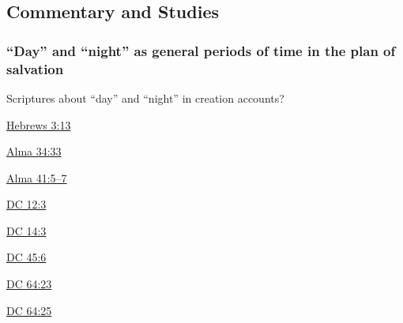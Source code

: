 	
\subsection{Commentary and Studies} %
	\label{DAY-COMMENTARY}

	
		
	\subsubsection{``Day'' and ``night'' as general periods of time in the plan of salvation}
		\label{DAY-night}
		
		\begin{compactitem}
			\item Scriptures about ``day'' and ``night'' in creation accounts? 
			\item \hyperref[HEBREWS-3-13]{Hebrews 3:13}
			\item \hyperref[ALMA-34-33]{Alma 34:33}
			\item \hyperref[ALMA-41-5]{Alma 41:5--7}
			\item \hyperref[DC12-3]{DC 12:3}
			\item \hyperref[DC14-3]{DC 14:3}
			\item \hyperref[DC45-6]{DC 45:6}
			\item \hyperref[DC64-23]{DC 64:23}
			\item \hyperref[DC64-25]{DC 64:25}
		\end{compactitem}